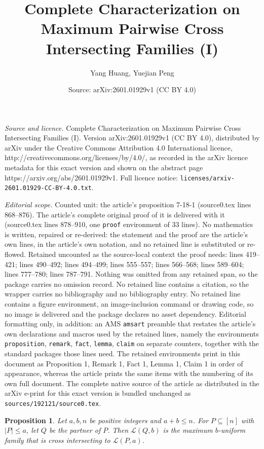 \documentclass[10pt,a4paper]{amsart}
\title{Complete Characterization on Maximum Pairwise Cross Intersecting Families (I)}
\author{Yang Huang, Yuejian Peng}
\date{Source: arXiv:2601.01929v1 (CC BY 4.0)}
\newtheorem{proposition}{Proposition}
\begin{document}
\maketitle

\noindent\emph{Source and licence.} Complete Characterization on Maximum Pairwise Cross Intersecting Families (I). Version arXiv:2601.01929v1 (CC BY 4.0), distributed by arXiv under the Creative Commons Attribution 4.0 International licence, http://creativecommons.org/licenses/by/4.0/, as recorded in the arXiv licence metadata for this exact version and shown on the abstract page https://arxiv.org/abs/2601.01929v1. Full licence notice: \texttt{licenses/arxiv-2601.01929-CC-BY-4.0.txt}.\par\smallskip

\noindent\textit{Editorial scope.} Counted unit: the article's proposition 7-18-1 (source0.tex lines 868--876). The article's complete original proof of it is delivered with it (source0.tex lines 878--910, one \texttt{proof} environment of 33 lines). No mathematics is written, repaired or re-derived: the statement and the proof are the article's own lines, in the article's own notation, and no retained line is substituted or re-flowed.  Retained uncounted as the source-local context the proof needs: lines 419--421; lines 490--492; lines 494--499; lines 555--557; lines 566--568; lines 589--604; lines 777--780; lines 787--791.  Nothing was omitted from any retained span, so the package carries no omission record.  No retained line contains a citation, so the wrapper carries no bibliography and no bibliography entry.  No retained line contains a figure environment, an image-inclusion command or drawing code, so no image is delivered and the package declares no asset dependency.  Editorial formatting only, in addition: an AMS \texttt{amsart} preamble that restates the article's own declarations and macros used by the retained lines, namely the environments \texttt{proposition}, \texttt{remark}, \texttt{fact}, \texttt{lemma}, \texttt{claim} on separate counters, together with the standard packages those lines need.  The retained environments print in this document as Proposition 1, Remark 1, Fact 1, Lemma 1, Claim 1 in order of appearance, whereas the article prints the same items with the numbering of its own full document.  The complete native source of the article as distributed in the arXiv e-print for this exact version is bundled unchanged as \texttt{sources/192121/source0.tex}.
\begin{proposition}\label{p2.7}
Let $a, b, n$ be positive integers and $a+b\leq n$. For $P\subseteq [n]$ with $|P|\leq a$, let $Q$ be the partner of $P$. Then $\mathcal{L}(Q, b)$ is the maximum  $b$-uniform family that is cross intersecting to $\mathcal{L}(P, a)$.
\end{proposition}
\end{document}
